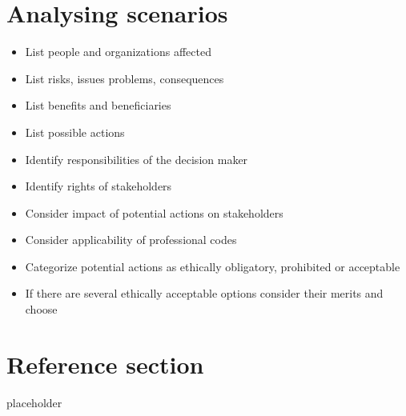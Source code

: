 \documentclass{article}
\begin{document}
\section{Analysing scenarios}
\begin{itemize}
  \item List people and organizations affected
  \item List risks, issues problems, consequences
  \item List benefits and beneficiaries
  \item List possible actions
  \item Identify responsibilities of the decision maker
  \item Identify rights of stakeholders
  \item Consider impact of potential actions on stakeholders 
  \item Consider applicability of professional codes
  \item Categorize potential actions as ethically obligatory, prohibited or acceptable
  \item If there are several ethically acceptable options consider their merits and choose
\end{itemize}

\pagebreak
\section*{Reference section} \label{sec:reference}
\begin{description}
	\item[placeholder] \hfill \\
\end{description}
\end{document}
